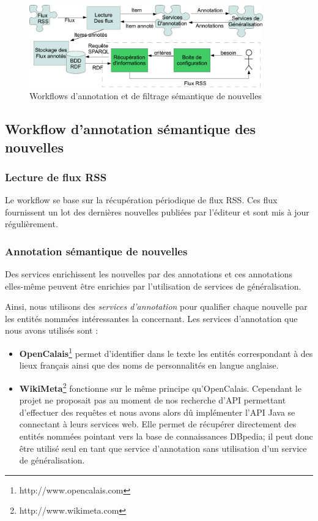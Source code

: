 \documentclass[]{ciel}
\begin{document}
\begin{figure}[htb!]
	\begin{centering}
	\includegraphics[width=0.9\textwidth]{diagramme-Archi.png}
	\caption{Workflows d'annotation et de filtrage sémantique de nouvelles}
	\label{fig:WF}
	\end{centering}
\end{figure}

\subsection{Workflow d'annotation sémantique des nouvelles}

\subsubsection{Lecture de flux RSS}
Le workflow se base sur la récupération périodique de flux RSS. Ces flux fournissent un lot des dernières nouvelles publiées par l'éditeur et sont mis à jour régulièrement.

\subsubsection{Annotation sémantique de nouvelles}
Des services enrichissent les nouvelles par des annotations et ces annotations elles-même peuvent être enrichies par l'utilisation de services de généralisation. 

Ainsi, nous utilisons des \textit{services d'annotation} pour qualifier chaque nouvelle par les entités nommées intéressantes la concernant. Les services d'annotation que nous avons utilisés sont : 
\begin{itemize}
	\item \textbf{OpenCalais}\footnote{http://www.opencalais.com} permet d'identifier dans le texte les entités correspondant à des lieux français ainsi que des noms de personnalités en langue anglaise. 
  \item \textbf{WikiMeta}\footnote{http://www.wikimeta.com} fonctionne sur le même principe qu'OpenCalais. Cependant le projet ne proposait pas au moment de nos recherche d'API permettant d'effectuer des requêtes et nous avons alors dû implémenter l'API Java se connectant à leurs services web. Elle permet de récupérer directement des entités nommées pointant vers la base de connaissances DBpedia; il peut donc être utilisé seul en tant que service d'annotation sans utilisation d'un service de généralisation.
\end{itemize}
\end{document}

